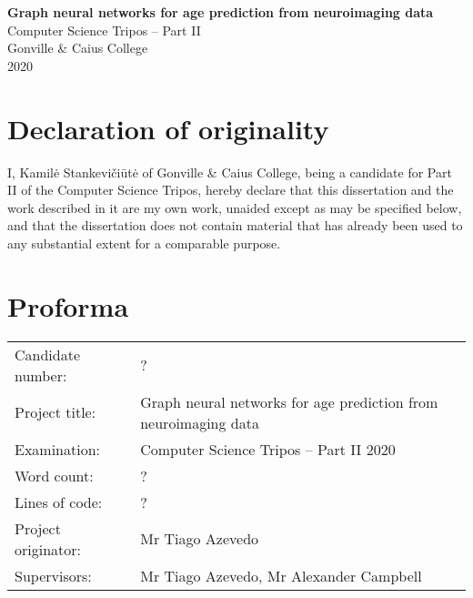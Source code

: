 \documentclass[12pt,a4paper,twoside, openright, hidelinks]{report}
\begin{document}


\pagestyle{empty}
\thispagestyle{empty}


\vspace*{60mm}
\begin{center}
\LARGE
\textbf{Graph neural networks for age prediction from neuroimaging data} \\[5mm]
\large
Computer Science Tripos -- Part II \\[5mm]
Gonville \& Caius College \\[5mm]
2020
\end{center}


\pagestyle{plain}
\newpage
\chapter*{Declaration of originality}

I, Kamilė Stankevičiūtė of Gonville \& Caius College, being a candidate for Part II of the Computer Science Tripos, hereby declare that this dissertation and the work described in it are my own work, unaided except as may be specified below, and that the dissertation does not contain material that has already been used to any substantial extent for a comparable purpose.

\bigskip
{}

\medskip
{}

\chapter*{Proforma}

\begin{tabular}{ll}
Candidate number:   & ?                  \\
Project title:      & Graph neural networks for age prediction from neuroimaging data \\
Examination:        & Computer Science Tripos -- Part II 2020 \\
Word count:         & ? \footnotemark[1] \\
Lines of code:      & ?  \\
Project originator: & Mr Tiago Azevedo                        \\
Supervisors:        & Mr Tiago Azevedo, Mr Alexander Campbell \\ 
\end{tabular}
\end{document}
